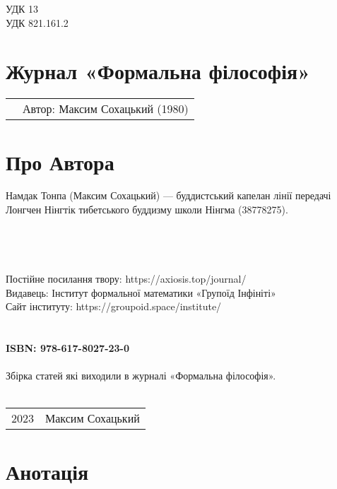 \noindent УДК 13\\
УДК 821.161.2

\section*{Журнал «Формальна філософія»}

\begin{tabular}{ll}
& Автор: Максим Сохацький (1980)\\
\end{tabular}

\section*{Про Автора}
Намдак Тонпа (Максим Сохацький) ---
буддистський капелан лінії передачі
Лонгчен Нінгтік тибетського буддизму школи Нінгма (38778275).
\\
\\
\\
\\
\\
Постійне посилання твору: https://axiosis.top/journal/ \\
Видавець: Інститут формальної математики «Групоїд Інфініті» \\
Сайт інституту: https://groupoid.space/institute/ \\
\\
\\
{\bf ISBN: 978-617-8027-23-0 \hspace{2em}}
\\
\\
\small
\indent Збірка статей які виходили в журналі «Формальна філософія».
\\
\\
\begin{tabular}{ll}
\textcopyright{} 2023 & Максим Сохацький
\end{tabular}

\newpage
\section*{Анотація}

\normalsize
